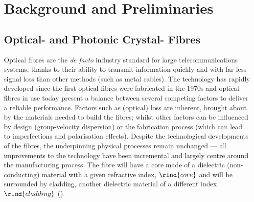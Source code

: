 \chapter{Background and Preliminaries} \label{ch:Intro}

\section{Optical- and Photonic Crystal- Fibres} \label{sec:PCFs}
Optical fibres are the \textit{de facto} industry standard for large telecommunications systems, thanks to their ability to transmit information quickly and with far less signal loss than other methods (such as metal cables).
The technology has rapidly developed since the first optical fibres were fabricated in the 1970s \cite{knight2003photonic} and optical fibres in use today present a balance between several competing factors to deliver a reliable performance.
Factors such as (optical) loss are inherent, brought about by the materials needed to build the fibres; whilst other factors can be influenced by design (group-velocity dispersion) or the fabrication process (which can lead to imperfections and polarisation effects).
Despite the technological developments of the fibres, the underpinning physical processes remain unchanged --- all improvements to the technology have been incremental and largely centre around the manufacturing process.
The fibre will have a core made of a dielectric (non-conducting) material with a given refractive index, $\rInd{core}$ and will be surrounded by cladding, another dielectric material of a different index $\rInd{cladding}$ ().
